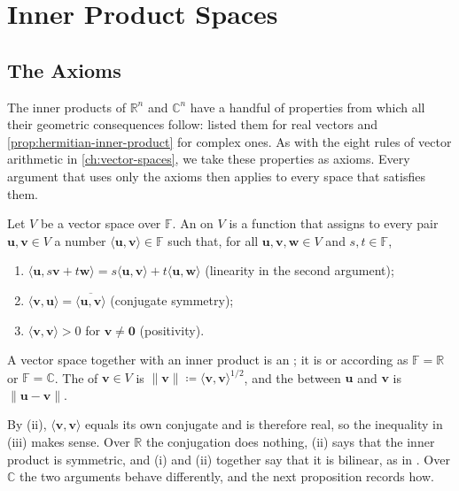 \section{Inner Product Spaces}
\label{sec:inner-product-spaces}

\subsection{The Axioms}

The inner products of $\mathbb R^n$ and $\mathbb C^n$ have a handful of properties from which all their geometric consequences follow:  listed them for real vectors and \cref{prop:hermitian-inner-product} for complex ones. As with the eight rules of vector arithmetic in \cref{ch:vector-spaces}, we take these properties as axioms. Every argument that uses only the axioms then applies to every space that satisfies them.

\begin{definition}
\label{def:inner-product-space}
Let $V$ be a vector space over $\mathbb F$. An  on $V$ is a function that assigns to every pair $\mathbf u,\mathbf v\in V$ a number $\langle\mathbf u,\mathbf v\rangle\in\mathbb F$ such that, for all $\mathbf u,\mathbf v,\mathbf w\in V$ and $s,t\in\mathbb F$,
\begin{enumerate}
\item $\langle\mathbf u,s\mathbf v+t\mathbf w\rangle=s\langle\mathbf u,\mathbf v\rangle+t\langle\mathbf u,\mathbf w\rangle$ (linearity in the second argument);
\item $\langle\mathbf v,\mathbf u\rangle=\overline{\langle\mathbf u,\mathbf v\rangle}$ (conjugate symmetry);
\item $\langle\mathbf v,\mathbf v\rangle>0$ for $\mathbf v\ne\mathbf 0$ (positivity).
\end{enumerate}
A vector space together with an inner product is an ; it is  or  according as $\mathbb F=\mathbb R$ or $\mathbb F=\mathbb C$. The  of $\mathbf v\in V$ is $\|\mathbf v\|\coloneqq\langle\mathbf v,\mathbf v\rangle^{1/2}$, and the  between $\mathbf u$ and $\mathbf v$ is $\|\mathbf u-\mathbf v\|$.
\end{definition}

By (ii), $\langle\mathbf v,\mathbf v\rangle$ equals its own conjugate and is therefore real, so the inequality in (iii) makes sense. Over $\mathbb R$ the conjugation does nothing, (ii) says that the inner product is symmetric, and (i) and (ii) together say that it is bilinear, as in . Over $\mathbb C$ the two arguments behave differently, and the next proposition records how.

